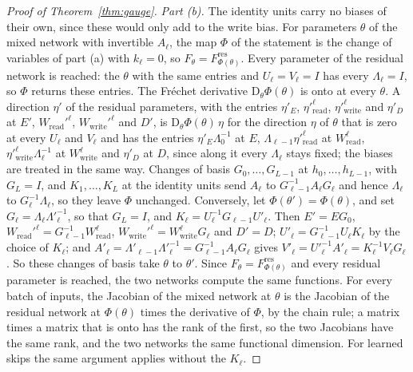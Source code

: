 \documentclass[10pt]{article}
\theoremstyle{definition}
\theoremstyle{remark}
\newcommand{\Wread}{W_{\mathrm{read}}}
\newcommand{\Wwrite}{W_{\mathrm{write}}}
\newcommand{\Der}{\mathrm{D}}
\begin{document}
\begin{proof}[Proof of Theorem~\ref{thm:gauge}]
\emph{Part (b).} The identity units carry no biases of their own, since these would only add to the write bias. For parameters $\theta$ of the mixed network with invertible $A_\ell$, the map $\Phi$ of the statement is the change of variables of part (a) with $k_\ell = 0$, so $F_\theta = F^{\mathrm{res}}_{\Phi(\theta)}$. Every parameter of the residual network is reached: the $\theta$ with the same entries and $U_\ell = V_\ell = I$ has every $\Lambda_\ell = I$, so $\Phi$ returns these entries. The Fr\'echet derivative $\Der_\theta\Phi(\theta)$ is onto at every $\theta$. A direction $\eta'$ of the residual parameters, with the entries $\eta'_E$, $\eta'^{\ell}_{\mathrm{read}}$, $\eta'^{\ell}_{\mathrm{write}}$ and $\eta'_D$ at $E'$, $\Wread'^{\ell}$, $\Wwrite'^{\ell}$ and $D'$, is $\Der_\theta\Phi(\theta)\,\eta$ for the direction $\eta$ of $\theta$ that is zero at every $U_\ell$ and $V_\ell$ and has the entries $\eta'_E\Lambda_0^{-1}$ at $E$, $\Lambda_{\ell-1}\eta'^{\ell}_{\mathrm{read}}$ at $\Wread^{\ell}$, $\eta'^{\ell}_{\mathrm{write}}\Lambda_\ell^{-1}$ at $\Wwrite^{\ell}$ and $\eta'_D$ at $D$, since along it every $\Lambda_\ell$ stays fixed; the biases are treated in the same way. Changes of basis $G_0, \dots, G_{L-1}$ at $h_0, \dots, h_{L-1}$, with $G_L = I$, and $K_1, \dots, K_L$ at the identity units send $A_\ell$ to $G_{\ell-1}^{-1}A_\ell G_\ell$ and hence $\Lambda_\ell$ to $G_\ell^{-1}\Lambda_\ell$, so they leave $\Phi$ unchanged. Conversely, let $\Phi(\theta') = \Phi(\theta)$, and set $G_\ell = \Lambda_\ell\Lambda'^{-1}_\ell$, so that $G_L = I$, and $K_\ell = U_\ell^{-1}G_{\ell-1}U'_\ell$. Then $E' = EG_0$, $\Wread'^{\ell} = G_{\ell-1}^{-1}\Wread^{\ell}$, $\Wwrite'^{\ell} = \Wwrite^{\ell}G_\ell$ and $D' = D$; $U'_\ell = G_{\ell-1}^{-1}U_\ell K_\ell$ by the choice of $K_\ell$; and $A'_\ell = \Lambda'_{\ell-1}\Lambda'^{-1}_\ell = G_{\ell-1}^{-1}A_\ell G_\ell$ gives $V'_\ell = U'^{-1}_\ell A'_\ell = K_\ell^{-1}V_\ell G_\ell$. So these changes of basis take $\theta$ to $\theta'$. Since $F_\theta = F^{\mathrm{res}}_{\Phi(\theta)}$ and every residual parameter is reached, the two networks compute the same functions. For every batch of inputs, the Jacobian of the mixed network at $\theta$ is the Jacobian of the residual network at $\Phi(\theta)$ times the derivative of $\Phi$, by the chain rule; a matrix times a matrix that is onto has the rank of the first, so the two Jacobians have the same rank, and the two networks the same functional dimension. For learned skips the same argument applies without the $K_\ell$.


\end{proof}
\end{document}
